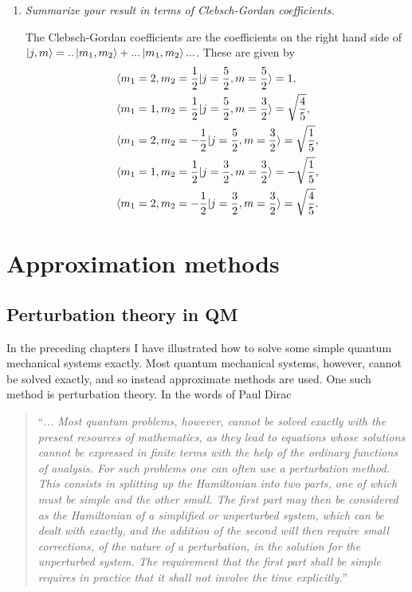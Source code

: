 \begin{example}
\begin{enumerate}
		\item \emph{Summarize your result in terms of Clebsch-Gordan coefficients.}\newline
		
		The Clebsch-Gordan coefficients are the coefficients on the right hand side of $\ket{j,m}=..\ket{m_1,m_2}+...\ket{m_1,m_2}...$. These are given by
		\begin{equation}
			\begin{split}
				&\braket{m_1=2,m_2=\frac{1}{2}|j=\frac{5}{2},m=\frac{5}{2}}=1,\\
				&\braket{m_1=1,m_2=\frac{1}{2}|j=\frac{5}{2},m=\frac{3}{2}}=\sqrt{\frac{4}{5}},\\
				&\braket{m_1=2,m_2=-\frac{1}{2}|j=\frac{5}{2},m=\frac{3}{2}}=\sqrt{\frac{1}{5}},\\
				&\braket{m_1=1,m_2=\frac{1}{2}|j=\frac{3}{2},m=\frac{3}{2}}=-\sqrt{\frac{1}{5}},\\
				&\braket{m_1=2,m_2=-\frac{1}{2}|j=\frac{3}{2},m=\frac{3}{2}}=\sqrt{\frac{4}{5}}.\\
			\end{split}
		\end{equation} 
		
	\end{enumerate}
\end{example}


\chapter{Approximation methods}


\section{Perturbation theory in QM}
\label{chp:TDPT}
In the preceding chapters I have illustrated how to solve some simple quantum mechanical systems exactly. Most quantum mechanical systems, however, cannot be solved exactly, and so instead approximate methods are used. One such method is perturbation theory. In the words of Paul Dirac~\citep[p.167]{dirac} 

\begin{quote}
	“\textit{... Most quantum problems, however, cannot be solved exactly with the present resources of mathematics, as they lead to equations whose solutions cannot be expressed in finite terms with the help of the ordinary functions of analysis. For such problems one can often use a perturbation method. This consists in splitting up the Hamiltonian into two parts, one of which must be simple and the other small. The first part may then be considered as the Hamiltonian of a simplified or unperturbed system, which can be dealt with exactly, and the addition of the second will then require small corrections, of the nature of a perturbation, in the solution for the unperturbed system. The requirement that the first part shall be simple requires in practice that it shall not involve the time explicitly.}”
\end{quote} 

